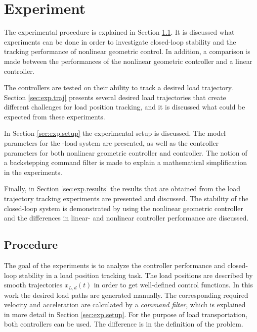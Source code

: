 \chapter{Experiment}\label{ch:exp}
The experimental procedure is explained in Section \ref{sec:exp.proc}. 
It is discussed what experiments can be done in order to investigate closed-loop stability and the tracking performance of nonlinear geometric control.
In addition, a comparison is made between the performances of the nonlinear geometric controller and a linear  controller.

The controllers are tested on their ability to track a desired load trajectory. 
Section \ref{sec:exp.traj} presents several desired load trajectories that create different challenges for load position tracking, and it is discussed what could be expected from these experiments.

%
In Section \ref{sec:exp.setup} the experimental setup is discussed. 
The model parameters for the -load system are presented, as well as the controller parameters for both nonlinear geometric controller and  controller.
The notion of a backstepping command filter is made to explain a mathematical simplification in the experiments.

Finally, in Section \ref{sec:exp.results} the results that are obtained from the load trajectory tracking experiments are presented and discussed.
The stability of the closed-loop system is demonstrated by using the nonlinear geometric controller and the differences in linear- and nonlinear controller performance are discussed.

\newpage
\section{Procedure}\label{sec:exp.proc}
The goal of the experiments is to analyze the controller performance and closed-loop stability in a load position tracking task.
The load positions are described by smooth trajectories $ x_{L,d}(t) $ in order to get well-defined control functions.
In this work the desired load paths are generated manually. 
The corresponding required velocity and acceleration are calculated by a \textit{command filter}, which is explained in more detail in Section \ref{sec:exp.setup}.
For the purpose of load transportation, both controllers can be used. The difference is in the definition of the problem.

